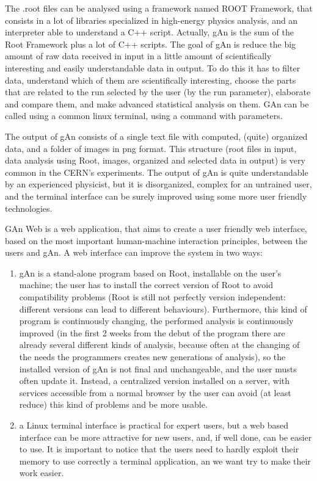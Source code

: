 The .root files can be analysed using a framework named ROOT Framework, that consists in a lot of libraries specialized in high-energy physics analysis, and an interpreter able to understand a C++ script.
Actually, gAn is the sum of the Root Framework plus a lot of C++ scripts.
The goal of gAn is reduce the big amount of raw data received in input in a little amount of scientifically interesting and easily understandable data in output. To do this it has to filter data, understand which of them are scientifically interesting, choose the parts that are related to the run selected by the user (by the run parameter), elaborate and compare them, and make advanced statistical analysis on them.  
GAn can be called using a common linux terminal, using a command with parameters. 

The output of gAn consists of a single text file with computed, (quite) organized data, and a folder of images in png format.
This structure (root files in input, data analysis using Root, images, organized and selected data in output) is very common in the CERN's experiments. 
The output of gAn is quite understandable by an experienced physicist, but it is disorganized, complex for an untrained user, and the terminal interface can be surely improved using some more user friendly technologies.

GAn Web is a web application, that aims to create a user friendly web interface, based on the most important human-machine interaction principles, between the users and gAn.
A web interface can improve the system in two ways:

\begin{enumerate}

\item gAn is a stand-alone program based on Root, installable on the user's machine; the user has to install the correct version of Root to avoid compatibility problems (Root is still not perfectly version independent: different versions can lead to different behaviours). Furthermore, this kind of program is continuously changing, the performed analysis is continuously improved (in the first 2 weeks from the debut of the program there are already several different kinds of analysis, because often at the changing of the needs the programmers creates new generations of analysis), so the installed version of gAn is not final and unchangeable, and the user musts often update it. Instead, a centralized version installed on a server, with services accessible from a normal browser by the user can avoid (at least reduce) this kind of problems and be more usable.    
 

\item a Linux terminal interface is practical for expert users, but a web based interface can be more attractive for new users, and, if well done, can be easier to use. It is important to notice that the users need to hardly exploit their memory to use correctly a terminal application, an we want try to make their work easier.


\end{enumerate}


